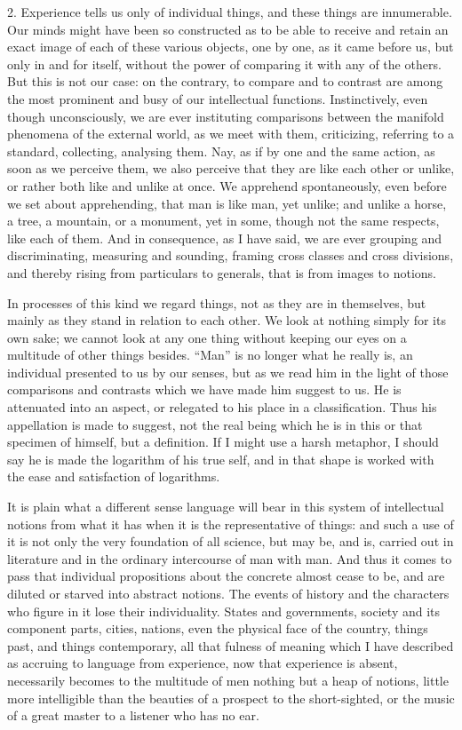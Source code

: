 2. Experience tells us only of individual things, and these things
are innumerable. Our minds might have been so constructed as to be
able to receive and retain an exact image of each of these various
objects, one by one, as it came before us, but only in and for itself,
without the power of comparing it with any of the others. But this is
not our case: on the contrary, to compare and to contrast are among
the most prominent and busy of our intellectual functions.
Instinctively, even though unconsciously, we are ever instituting
comparisons between the manifold phenomena of the external world, as
we meet with them, criticizing, referring to a standard, collecting,
analysing them. Nay, as if by one and the same action, as soon as we
perceive them, we also perceive that they are like each other or
unlike, or rather both like and unlike at once. We apprehend
spontaneously, even before we set about apprehending, that man is like
man, yet unlike; and unlike a horse, a tree, a mountain, or a
monument, yet in some, though not the same respects, like each of
them. And in consequence, as I have said, we are ever grouping and
discriminating, measuring and sounding, framing cross classes and
cross divisions, and thereby rising from particulars to generals, that
is from images to notions.

In processes of this kind we regard things, not as they are in
themselves, but mainly as they stand in relation to each other. We
look at nothing simply for its own sake; we cannot look at any one
thing without keeping our eyes on a multitude of other things besides.
``Man'' is no longer what he really is, an individual
presented to us by our senses, but as we read him in the light of
those comparisons and contrasts which we have made him suggest to us.
He is attenuated into an aspect, or relegated to his place in a
classification. Thus his appellation is made to suggest, not the real
being which he is in this or that specimen of himself, but a
definition. If I might use a harsh metaphor, I should say he is made
the logarithm of his true self, and in that shape is worked with the
ease and satisfaction of logarithms.

It is plain what a different sense language will bear in this
system of intellectual notions from what it has when it is the
representative of things: and such a use of it is not only the very
foundation of all science, but may be, and is, carried out in
literature and in the ordinary intercourse of man with man. And thus
it comes to pass that individual propositions about the concrete
almost cease to be, and are diluted or starved into abstract notions.
The events of history and the characters who figure in it lose their
individuality. States and governments, society and its component
parts, cities, nations, even the physical face of the country,
things past, and things contemporary, all that fulness of meaning
which I have described as accruing to language from experience, now
that experience is absent, necessarily becomes to the multitude of men
nothing but a heap of notions, little more intelligible than the
beauties of a prospect to the short-sighted, or the music of a great
master to a listener who has no ear.

